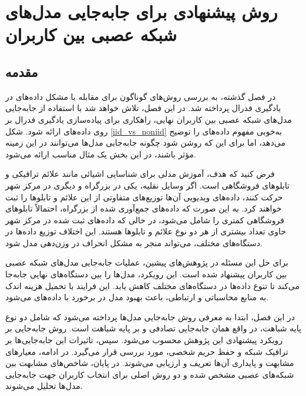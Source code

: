 \chapter{روش پیشنهادی برای جابه‌جایی مدل‌های شبکه عصبی بین کاربران}

\section{مقدمه}
در فصل گذشته، به بررسی روش‌های گوناگون برای مقابله با مشکل داده‌های 
در یادگیری فدرال پرداخته شد. در این فصل، تلاش خواهد شد با استفاده از جابه‌جایی مدل‌های شبکه عصبی بین کاربران نهایی، راهکاری برای پیاده‌سازی یادگیری فدرال بر روی داده‌های 
ارائه شود. شکل 
\ref{iid_vs_noniid}
به‌خوبی مفهوم داده‌های 
را توضیح می‌دهد، اما برای این که روشن شود چگونه جابه‌جایی مدل‌ها می‌توانند در این زمینه مؤثر باشند، در این بخش یک مثال مناسب ارائه می‌شود.

فرض کنید که هدف، آموزش مدلی برای شناسایی اشیائی مانند علائم ترافیکی و تابلوهای فروشگاهی است. اگر وسایل نقلیه، یکی در بزرگراه و دیگری در مرکز شهر حرکت کنند، داده‌های ویدیویی آن‌ها توزیع‌های متفاوتی از این علائم و تابلوها را ثبت خواهند کرد. به این صورت که داده‌های جمع‌آوری شده از بزرگراه، احتمالاً تابلوهای فروشگاهی کمتری را شامل می‌شود، در حالی که داده‌های ثبت شده در مرکز شهر حاوی تعداد بیشتری از هر دو نوع علائم و تابلوها هستند. این اختلاف توزیع داده‌ها در دستگاه‌های مختلف، می‌تواند منجر به مشکل انحراف در وزن‌دهی مدل شود.

برای حل این مسئله در پژوهش‌های پیشین، عملیات جابه‌جایی مدل‌های شبکه عصبی بین کاربران پیشنهاد شده است. این رویکرد، مدل‌ها را بین دستگاه‌های نهایی جابه‌جا می‌کند تا تنوع داده‌ها در دستگاه‌های مختلف کاهش یابد. این فرایند با تحمیل هزینه اندک به منابع محاسباتی و ارتباطی، باعث بهبود مدل در برخورد با داده‌های  
می‌شود.

در این فصل، ابتدا به معرفی روش جابه‌جایی مدل‌ها پرداخته می‌شود که شامل دو نوع جابه‌جایی تصادفی و بر پایه شباهت است. روش جابه‌جایی بر ‎پایه شباهت، در واقع همان رویکرد پیشنهادی این پژوهش محسوب می‌شود.
سپس، تاثیرات این جابه‌جایی‌ها بر ترافیک شبکه و حفظ حریم شخصی، مورد بررسی قرار می‌گیرد. در ادامه، معیارهای مشابهت و پایداری آن‌ها تعریف و ارزیابی می‌شوند. در پایان، شاخص‌های مشابهت بین شبکه‌های عصبی مشخص شده و دو روش اصلی برای انتخاب کاربران جهت جابه‌جایی مدل‌ها تحلیل می‌شوند.


